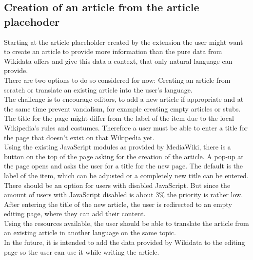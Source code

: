 \documentclass[11pt]{article}
\begin{document}
\subsection{Creation of an article from the article placehoder}
Starting at the article placeholder created by the extension the user might want to create an article to provide more information than the pure data from Wikidata offers and give this data a context, that only natural language can provide. \\
There are two options to do so considered for now: Creating an article from scratch or translate an existing article into the user's language. \\
The challenge is to encourage editors, to add a new article if appropriate and at the same time prevent vandalism, for example creating empty articles or stubs.\\ 
 The title for the page might differ from the label of the item due to the local Wikipedia's rules and costumes. Therefore a user must be able to enter a title for the page that doesn't exist on that Wikipedia yet. \\
Using the existing JavaScript modules as provided by MediaWiki, there is a button on the top of the page asking for the creation of the article. A pop-up at the page opens and asks the user for a title for the new page. The default is the label of the item, which can be adjusted or a completely new title can be entered. \\
There should be an option for users with disabled JavaScript. But since the amount of users with JavaScript disabled is about 3\% %
the priority is rather low. \\
After entering the title of the new article, the user is redirected to an empty editing page, where they can add their content. \\
Using the resources  available, the user should be able to translate the article from an existing article in another language on the same topic. \\
In the future, it is intended to add the data provided by Wikidata to the editing page so the user can use it while writing the article. 
\end{document}
